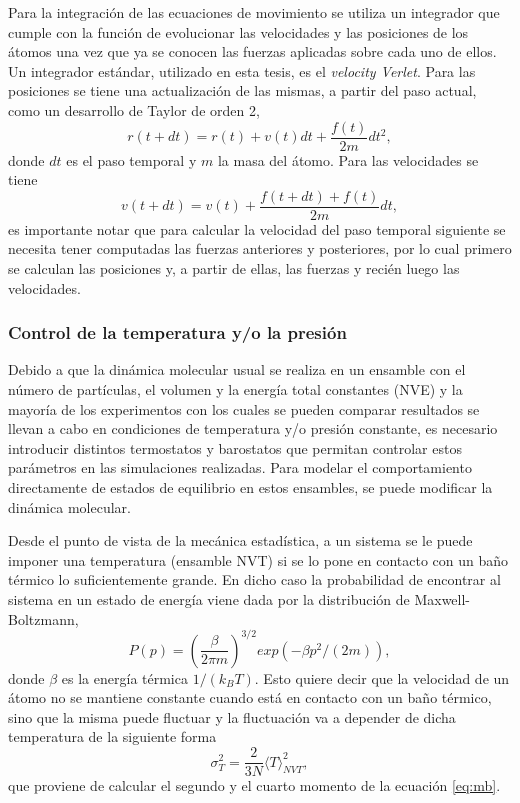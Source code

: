 Para la integración de las ecuaciones de movimiento se utiliza un integrador que 
cumple con la función de evolucionar las velocidades y las posiciones de los 
átomos una vez que ya se conocen las fuerzas aplicadas sobre cada uno de ellos.
Un integrador estándar, utilizado en esta tesis, es el \textit{velocity Verlet}. 
Para las posiciones se tiene una actualización de las mismas, a partir
del paso actual, como un desarrollo de Taylor de orden 2,
\begin{equation}
    r(t+dt) = r(t) + v(t) dt + \frac{f(t)}{2m} dt^2,
\end{equation}
donde $dt$ es el paso temporal y $m$ la masa del átomo. Para las velocidades se
tiene
\begin{equation}
    v(t+dt) = v(t) + \frac{f(t+dt)+f(t)}{2m} dt,
\end{equation}
es importante notar que para calcular la velocidad del paso temporal siguiente se
necesita tener computadas las fuerzas anteriores y posteriores, por lo cual
primero se calculan las posiciones y, a partir de ellas, las fuerzas y recién 
luego las velocidades. 


\subsubsection{Control de la temperatura y/o la presión}

Debido a que la dinámica molecular usual se realiza en un ensamble con el número 
de partículas, el volumen y la energía total constantes (NVE) y la mayoría de los
experimentos con los cuales se pueden comparar resultados se llevan a cabo en 
condiciones de temperatura y/o presión constante, es necesario introducir 
distintos termostatos y barostatos que permitan controlar estos parámetros en las 
simulaciones realizadas. Para modelar el comportamiento directamente de estados
de equilibrio en estos ensambles, se puede modificar la dinámica molecular. 

Desde el punto de vista de la mecánica estadística, a un sistema se le puede 
imponer una temperatura (ensamble NVT) si se lo pone en contacto con un baño 
térmico lo suficientemente grande. En dicho caso la probabilidad de encontrar al 
sistema en un estado de energía viene dada por la distribución de 
Maxwell-Boltzmann,
\begin{equation}\label{eq:mb}
    P(p) = \left( \frac{\beta}{2\pi m} \right)^{3/2} exp(-\beta p^2 / (2m)),
\end{equation}
donde $\beta$ es la energía térmica $1 / (k_B T)$. Esto quiere decir que la velocidad 
de un átomo no se mantiene constante cuando está en contacto con un baño térmico, 
sino que la misma puede fluctuar y la fluctuación va a depender de dicha 
temperatura de la siguiente forma
\begin{equation}
    \sigma_T^2 = \frac{2}{3 N} \langle T \rangle_{NVT}^2,
\end{equation}
que proviene de calcular el segundo y el cuarto momento de la ecuación 
\ref{eq:mb}.

